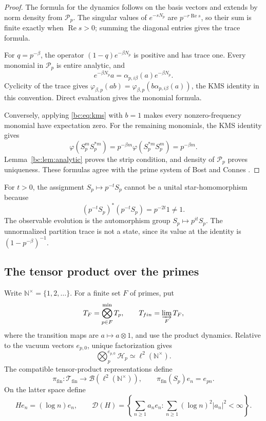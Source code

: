 \begin{proof}
The formula for the dynamics follows on the basis vectors and extends by
norm density from \(\mathcal P_p\).  The singular values of
\(e^{-sN_p}\) are \(p^{-r\operatorname{Re}s}\), so their sum is finite
exactly when \(\operatorname{Re}s>0\); summing the diagonal entries gives
the trace formula.

For \(q=p^{-\beta}\), the operator
\((1-q)e^{-\beta N_p}\) is positive and has trace one.  Every monomial in
\(\mathcal P_p\) is entire analytic, and
\[
 e^{-\beta N_p}a=\alpha_{p,i\beta}(a)e^{-\beta N_p}.
\]
Cyclicity of the trace gives
\(\varphi_{\beta,p}(ab)=
\varphi_{\beta,p}(b\alpha_{p,i\beta}(a))\), the KMS identity in this
convention.  Direct evaluation gives the monomial formula.

Conversely, applying \eqref{bc:eq:kms} with \(b=1\) makes every
nonzero-frequency monomial have expectation zero.  For the remaining monomials,
the KMS identity gives
\[
 \varphi(S_p^mS_p^{*m})
 =p^{-\beta m}\varphi(S_p^{*m}S_p^m)=p^{-\beta m}.
\]
Lemma~\ref{bc:lem:analytic} proves the strip condition, and density of
\(\mathcal P_p\) proves uniqueness.  These formulas agree with
the prime system of Bost and Connes
\cite[\S2, Propositions~7--8]{BostConnes1995}.
\end{proof}

\begin{remark}
For \(t>0\), the assignment \(S_p\mapsto p^{-t}S_p\) cannot be a unital
star-homomorphism because
\[
 (p^{-t}S_p)^*(p^{-t}S_p)=p^{-2t}1\ne1.
\]
The observable evolution is the automorphism group
\(S_p\mapsto p^{it}S_p\).  The unnormalized partition trace is not a
state, since its value at the identity is \((1-p^{-\beta})^{-1}\).
\end{remark}

\subsection{The tensor product over the primes}

Write \(\mathbb N^\times=\{1,2,\ldots\}\). For a finite set \(F\) of
primes, put
\[
 \mathcal T_F=\bigotimes_{p\in F}^{\min}\mathcal T_p,
 \qquad
 \mathcal T_{\mathrm{fin}}=\varinjlim_F\mathcal T_F,
\]
where the transition maps are \(a\mapsto a\otimes1\), and use the product
dynamics.  Relative to the vacuum vectors \(e_{p,0}\), unique
factorization gives
\[
 \bigotimes_p^{e_{p,0}}\mathscr H_p\simeq\ell^2(\mathbb N^\times).
\]
The compatible tensor-product representations define
\[
 \pi_{\mathrm{fin}}:\mathcal T_{\mathrm{fin}}
 \longrightarrow\mathcal B(\ell^2(\mathbb N^\times)),
 \qquad \pi_{\mathrm{fin}}(S_p)e_n=e_{pn}.
\]
On the latter space define
\[
 He_n=(\log n)e_n,\qquad
 \mathcal D(H)=
 \left\{\sum_{n\geq1}a_ne_n:
 \sum_{n\geq1}(\log n)^2|a_n|^2<\infty\right\}.
\]

